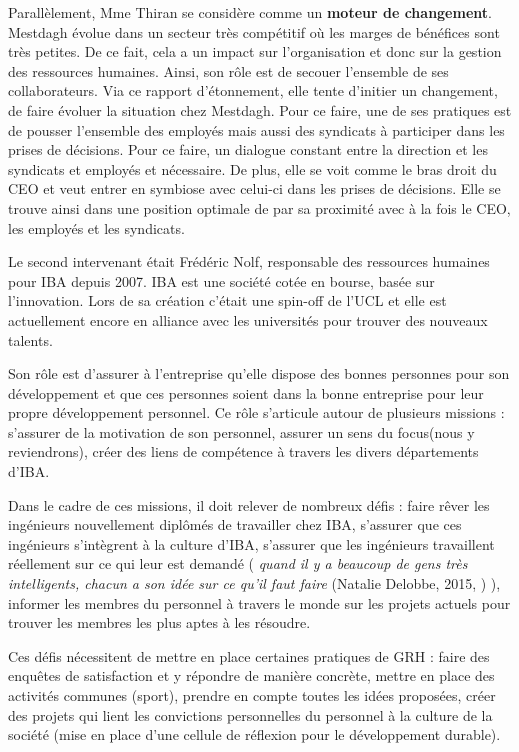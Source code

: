 Parallèlement, Mme Thiran se considère comme un \textbf{moteur de changement}.  Mestdagh évolue dans un secteur très compétitif où les marges de bénéfices sont très petites. De ce fait, cela a un impact sur l'organisation et donc sur la gestion des ressources humaines. Ainsi, son rôle est de secouer l'ensemble de ses collaborateurs. Via ce rapport d'étonnement, elle tente d'initier un changement, de faire évoluer la situation chez Mestdagh. \newline
Pour ce faire, une de ses pratiques est de pousser l'ensemble des employés mais aussi des syndicats à participer dans les prises de décisions. Pour ce faire, un dialogue constant entre la direction et les syndicats et employés et nécessaire. De plus, elle se voit comme le bras droit du CEO et veut entrer en symbiose avec celui-ci dans les prises de décisions. Elle se trouve ainsi dans une position optimale de par sa proximité avec à la fois le CEO, les employés et les syndicats.\newline

Le second intervenant était Frédéric Nolf, responsable des ressources humaines pour IBA depuis 2007. IBA est une société cotée en bourse, basée sur l'innovation. Lors de sa création c'était une spin-off de l'UCL et elle est actuellement encore en alliance avec les universités pour trouver des nouveaux talents. 

Son rôle est d'assurer à l'entreprise qu'elle dispose des bonnes personnes pour son développement et que ces personnes soient dans la bonne entreprise pour leur propre développement personnel. Ce rôle s'articule autour de plusieurs missions : s'assurer de la motivation de son personnel, assurer un \og{} sens du focus\fg{}(nous y reviendrons), créer des liens de compétence à travers les divers départements d'IBA. \newline

Dans le cadre de ces missions, il doit relever de nombreux défis : faire rêver les ingénieurs nouvellement diplômés de travailler chez IBA, s'assurer que ces ingénieurs s'intègrent à la culture d'IBA, s'assurer que les ingénieurs travaillent réellement sur ce qui leur est demandé (\textit{\og{} quand il y a beaucoup de gens très intelligents, chacun a son idée sur ce qu'il faut faire \fg{}} (Natalie Delobbe, 2015, \cite{tableronde}) ), informer les membres du personnel à travers le monde sur les projets actuels pour trouver les membres les plus aptes à les résoudre. \newline

Ces défis nécessitent de mettre en place certaines pratiques de GRH : faire des enquêtes de satisfaction et y répondre de manière concrète, mettre en place des activités communes (sport), prendre en compte toutes les idées proposées, créer des projets qui lient les convictions personnelles du personnel à la culture de la société (mise en place d'une cellule de réflexion pour le développement durable). \newline